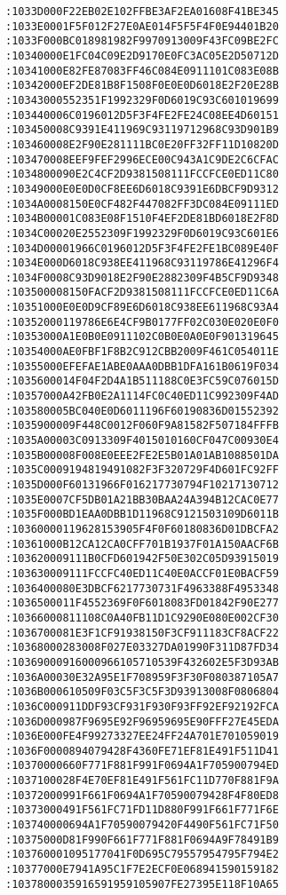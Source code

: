 \begin{lstlisting}[language={}, basicstyle=\scriptsize, caption=Машинний код]
:1033D000F22EB02E102FFBE3AF2EA01608F41BE345
:1033E0001F5F012F27E0AE014F5F5F4F0E94401B20
:1033F000BC018981982F9970913009F43FC09BE2FC
:10340000E1FC04C09E2D9170E0FC3AC05E2D50712D
:10341000E82FE87083FF46C084E0911101C083E08B
:10342000EF2DE81B8F1508F0E0E0D6018E2F20E28B
:10343000552351F1992329F0D6019C93C601019699
:103440006C0196012D5F3F4FE2FE24C08EE4D60151
:103450008C9391E411969C93119712968C93D901B9
:103460008E2F90E281111BC0E20FF32FF11D10820D
:103470008EEF9FEF2996ECE00C943A1C9DE2C6CFAC
:1034800090E2C4CF2D9381508111FCCFCE0ED11C80
:10349000E0E0D0CF8EE6D6018C9391E6DBCF9D9312
:1034A0008150E0CF482F447082FF3DC084E09111ED
:1034B00001C083E08F1510F4EF2DE81BD6018E2F8D
:1034C00020E2552309F1992329F0D6019C93C601E6
:1034D00001966C0196012D5F3F4FE2FE1BC089E40F
:1034E000D6018C938EE411968C93119786E41296F4
:1034F0008C93D9018E2F90E2882309F4B5CF9D9348
:103500008150FACF2D9381508111FCCFCE0ED11C6A
:10351000E0E0D9CF89E6D6018C938EE611968C93A4
:10352000119786E6E4CF9B0177FF02C030E020E0F0
:10353000A1E0B0E0911102C0B0E0A0E0F901319645
:10354000AE0FBF1F8B2C912CBB2009F461C054011E
:10355000EFEFAE1ABE0AAA0DBB1DFA161B0619F034
:1035600014F04F2D4A1B511188C0E3FC59C076015D
:10357000A42FB0E2A1114FC0C40ED11C992309F4AD
:103580005BC040E0D6011196F60190836D01552392
:1035900009F448C0012F060F9A81582F507184FFFB
:1035A00003C0913309F4015010160CF047C00930E4
:1035B00008F008E0EEE2FE2E5B01A01AB1088501DA
:1035C0009194819491082F3F320729F4D601FC92FF
:1035D000F60131966F016217730794F10217130712
:1035E0007CF5DB01A21BB30BAA24A394B12CAC0E77
:1035F000BD1EAA0DBB1D11968C9121503109D6011B
:10360000119628153905F4F0F60180836D01DBCFA2
:10361000B12CA12CA0CFF701B1937F01A150AACF6B
:103620009111B0CFD601942F50E302C05D93915019
:103630009111FCCFC40ED11C40E0ACCF01E0BACF59
:1036400080E3DBCF6217730731F4963388F4953348
:1036500011F4552369F0F6018083FD01842F90E277
:10366000811108C0A40FB11D1C9290E080E002CF30
:1036700081E3F1CF91938150F3CF911183CF8ACF22
:10368000283008F027E03327DA01990F311D87FD34
:10369000916000966105710539F432602E5F3D93AB
:1036A00030E32A95E1F708959F3F30F080387105A7
:1036B000610509F03C5F3C5F3D93913008F0806804
:1036C000911DDF93CF931F930F93FF92EF92192FCA
:1036D000987F9695E92F96959695E90FFF27E45EDA
:1036E000FE4F99273327EE24FF24A701E701059019
:1036F0000894079428F4360FE71EF81E491F511D41
:10370000660F771F881F991F0694A1F705900794ED
:1037100028F4E70EF81E491F561FC11D770F881F9A
:10372000991F661F0694A1F70590079428F4F80ED8
:10373000491F561FC71FD11D880F991F661F771F6E
:103740000694A1F70590079420F4490F561FC71F50
:10375000D81F990F661F771F881F0694A9F78491B9
:103760001095177041F0D695C79557954795F794E2
:10377000E7941A95C1F7E2ECF0E068941590159182
:1037800035916591959105907FE27395E118F10A65

\end{lstlisting}
